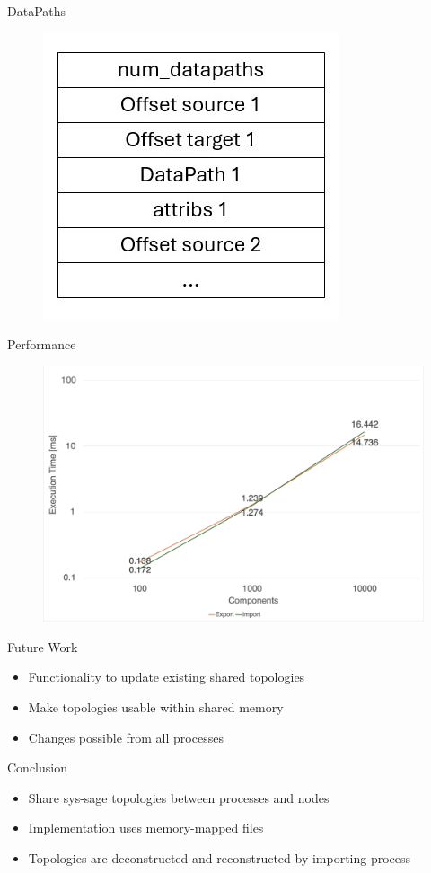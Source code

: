 \documentclass{beamer}
\begin{document}
\begin{frame}{DataPaths}
    \begin{figure}[!ht]
        \includegraphics[scale=0.7]{../images/export_dps.jpg}
        \centering
    \end{figure}
\end{frame}

\begin{frame}{Performance}
    \begin{figure}[!ht]
        \includegraphics[scale=0.19]{../images/component_numbers.jpeg}
        \centering
    \end{figure}
\end{frame}

\begin{frame}{Future Work}
    \begin{itemize}
        \item Functionality to update existing shared topologies
        \item Make topologies usable within shared memory
        \item Changes possible from all processes
    \end{itemize}
\end{frame}

\begin{frame}{Conclusion}
    \begin{itemize}
        \item Share sys-sage topologies between processes and nodes
        \item Implementation uses memory-mapped files
        \item Topologies are deconstructed and reconstructed by importing process
    \end{itemize}
\end{frame}
\end{document}
